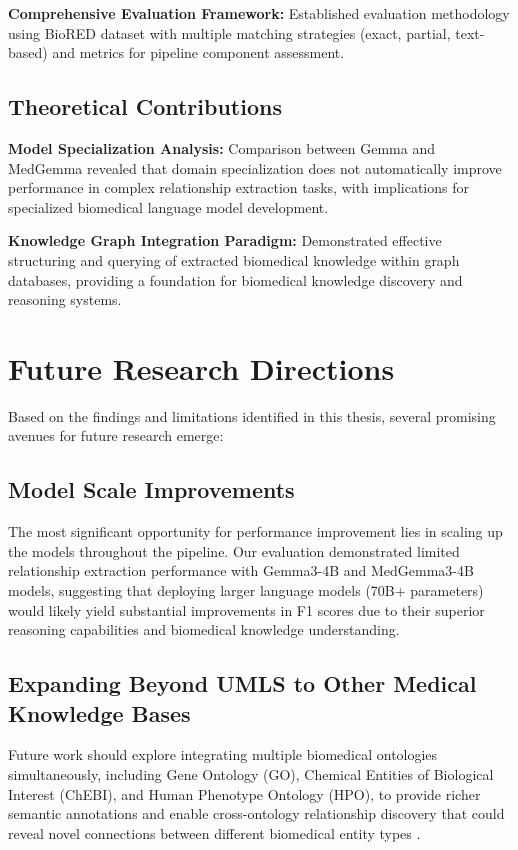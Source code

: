 \textbf{Comprehensive Evaluation Framework:} Established evaluation methodology using BioRED dataset with multiple matching strategies (exact, partial, text-based) and metrics for pipeline component assessment.

\subsection{Theoretical Contributions}

\textbf{Model Specialization Analysis:} Comparison between Gemma and MedGemma revealed that domain specialization does not automatically improve performance in complex relationship extraction tasks, with implications for specialized biomedical language model development.

\textbf{Knowledge Graph Integration Paradigm:} Demonstrated effective structuring and querying of extracted biomedical knowledge within graph databases, providing a foundation for biomedical knowledge discovery and reasoning systems.


\section{Future Research Directions}

Based on the findings and limitations identified in this thesis, several promising avenues for future research emerge:

\subsection{Model Scale Improvements}

The most significant opportunity for performance improvement lies in scaling up the models throughout the pipeline. Our evaluation demonstrated limited relationship extraction performance with Gemma3-4B and MedGemma3-4B models, suggesting that deploying larger language models (70B+ parameters) would likely yield substantial improvements in F1 scores due to their superior reasoning capabilities and biomedical knowledge understanding.

\subsection{Expanding Beyond UMLS to Other Medical Knowledge Bases}

Future work should explore integrating multiple biomedical ontologies simultaneously, including Gene Ontology (GO), Chemical Entities of Biological Interest (ChEBI), and Human Phenotype Ontology (HPO), to provide richer semantic annotations and enable cross-ontology relationship discovery that could reveal novel connections between different biomedical entity types \parencite{Himmelstein2017}.

